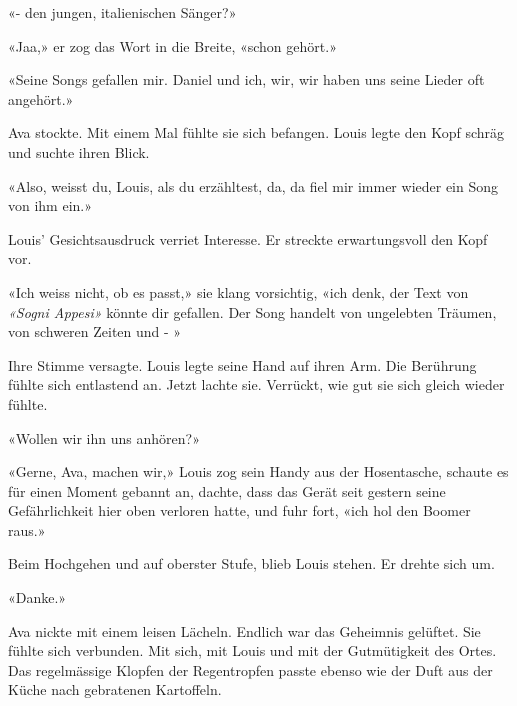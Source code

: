  «- den jungen, italienischen Sänger?»

«Jaa,» er zog das Wort in die Breite,
«schon gehört.»

«Seine Songs gefallen mir. Daniel und ich, wir, wir haben uns seine
Lieder oft angehört.»

Ava stockte. Mit einem Mal fühlte sie sich befangen. Louis
legte den Kopf schräg und suchte ihren Blick.

«Also, weisst du, Louis, als du erzähltest, da, da fiel mir immer
wieder ein Song von ihm ein.»

Louis’ Gesichtsausdruck verriet Interesse. Er streckte erwartungsvoll den Kopf vor.

«Ich weiss nicht, ob es passt,» sie klang vorsichtig, «ich denk, der
Text von \emph{«Sogni Appesi»} könnte dir gefallen. Der Song handelt
von ungelebten Träumen, von schweren Zeiten und - »

Ihre Stimme versagte. Louis legte seine Hand auf ihren Arm. Die Berührung fühlte
sich entlastend an. Jetzt lachte sie. Verrückt, wie gut sie sich
gleich wieder fühlte.

«Wollen wir ihn uns anhören?»

«Gerne, Ava, machen wir,» Louis zog sein Handy aus der Hosentasche,
schaute es für einen Moment gebannt an, dachte, dass das Gerät seit
gestern seine Gefährlichkeit hier oben verloren hatte, und fuhr fort,
«ich hol den Boomer raus.»

Beim Hochgehen und auf oberster Stufe, blieb Louis stehen. Er drehte
sich um.

«Danke.»

Ava nickte mit einem leisen Lächeln. Endlich war das Geheimnis gelüftet. Sie fühlte sich verbunden.
Mit sich, mit Louis und mit der Gutmütigkeit des Ortes. Das regelmässige Klopfen der Regentropfen passte ebenso wie der Duft aus der Küche nach gebratenen Kartoffeln. 

